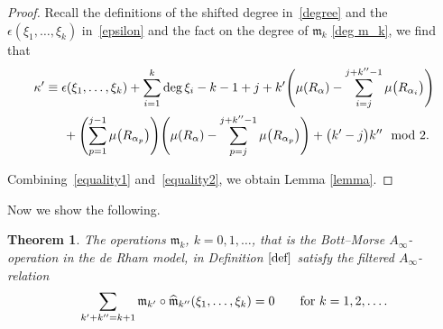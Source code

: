 \documentclass[pdftex]{sigma}
\numberwithin{equation}{section}
\newtheorem{thm}{Theorem}[section]
\theoremstyle{definition}
\begin{document}
\begin{proof}
Recall the definitions of the shifted degree in~\eqref{degree} and the $\epsilon(\xi_1, \dots, \xi_k)$ in~\eqref{epsilon} and the fact on
the degree of ${\mathfrak m}_k$ \eqref{deg m_k}, we find that
\begin{gather*}
\kappa'\equiv \epsilon(\xi_1, \dots, \xi_k) + \sum_{i=1}^{k} \deg \xi_i - k - 1 + j + k' \Biggl( \mu(R_{\alpha}) - \sum_{i=j}^{j+k''-1} \mu\bigl(R_{\alpha_i}\bigr) \Biggr)
 \\ \hphantom{\kappa'\equiv }{}
+ \Biggl(\sum_{p=1}^{j-1} \mu\bigl(R_{\alpha_p}\bigr)\Biggr)\Biggl(\mu(R_{\alpha}) - \sum_{p=j}^{j+k''-1} \mu\bigl(R_{\alpha_p}\bigr)\Biggr) + \bigl(k'-j\bigr)k'' \mod 2.
\end{gather*}

Combining~\eqref{equality1} and~\eqref{equality2}, we obtain Lemma \ref{lemma}.
\end{proof}

Now we show the following.
\begin{thm}\label{conclusion}
The operations ${\mathfrak m}_k$, $k = 0, 1, \dots$, that is the Bott--Morse $A_{\infty}$-operation in the de Rham model, in Definition $\ref{def}$ satisfy the filtered $A_{\infty}$-relation
\begin{equation*}
\sum_{k' + k'' = k+1} {\mathfrak m}_{k'} \circ \widehat{\mathfrak m}_{k''} (\xi_1, \dots, \xi_k) = 0 \qquad {\rm for} \ k=1,2, \dots.
\end{equation*}
\end{thm}
\end{document}
